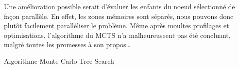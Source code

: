 Une amélioration possible serait d'évaluer les enfants du noeud sélectionné de façon parallèle.
En effet, les zones mémoires sont séparés, nous pouvons donc plutôt facilement paralléliser le problème.
Même après moultes profilages et optimisations, l'algorithme du MCTS n'a malheureuseent pas été concluant, malgré
toutes les promesses à son propos\dots

\begin{algorithm}
	\caption{Algorithme Monte Carlo Tree Search}
	\label{alg:mcts}
\end{algorithm}